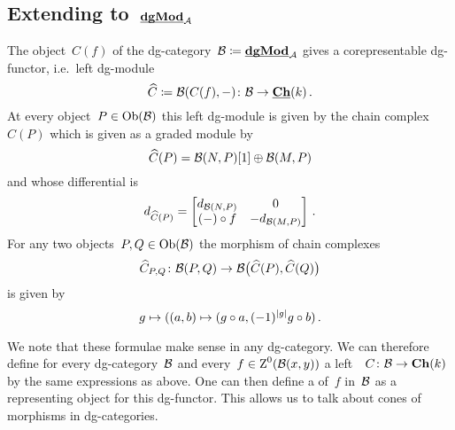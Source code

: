 \documentclass[a4paper,10pt]{scrartcl}
\begin{document}
\subsection{Extending to~$\underline{\smash{\mathbf{dgMod}}}_{\mathcal{A}}$}

The object~$C(f)$ of the dg-category~$\mathcal{B} \coloneqq \underline{\smash{\mathbf{dgMod}}}_{\mathcal{A}}$ gives a corepresentable dg-functor, i.e.~left dg-module
\[
  \widehat{C}
  \coloneqq
  \mathcal{B}(C(f), -)
  \colon
  \mathcal{B}
  \to
  \underline{\mathbf{Ch}}(k) \,.
\]
At every object~$P \in \operatorname{Ob}(\mathcal{B})$ this left dg-module is given by the chain complex~$\widehat{C}(P)$ which is given as a graded module by
\[
  \widehat{C}(P)
  =
  \mathcal{B}(N,P)[1] \oplus \mathcal{B}(M,P)
\]
and whose differential is
\[
  d_{\widehat{C}(P)}
  =
  \begin{bmatrix}
    d_{\mathcal{B}(N,P)} &  0               \\
    (-) \circ f    & -d_{\mathcal{B}(M,P)}
  \end{bmatrix} \,.
\]
For any two objects~$P, Q \in \operatorname{Ob}(\mathcal{B})$ the morphism of chain complexes
\[
  \widehat{C}_{P,Q}
  \colon
  \mathcal{B}(P,Q)
  \to
  \mathcal{B}\bigl( \widehat{C}(P), \widehat{C}(Q) \bigr)
\]
is given by
\[
  g
  \mapsto
  ((a,b) \mapsto (g \circ a, (-1)^{\lvert g\rvert} g \circ b) \,.
\]

We note that these formulae make sense in any dg-category.
We can therefore define for every dg-category~$\Bcat$ and every~$f \in \operatorname{Z}^0(\mathcal{B}(x,y))$ a left~{\dgmodule{$\Bcat$}}~$C \colon \mathcal{B} \to \mathbf{Ch}(k)$ by the same expressions as above.
One can then define a  of~$f$ in~$\Bcat$ as a representing object for this dg-functor.
This allows us to talk about cones of morphisms in dg-categories.
\end{document}
